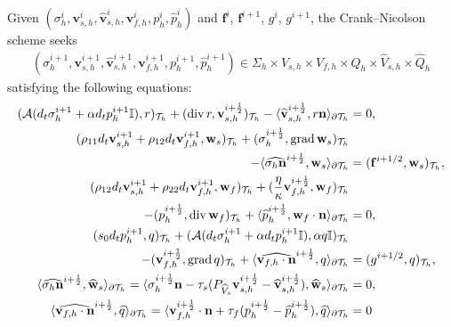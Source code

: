 \documentclass[10pt,letterpaper]{amsart}
\theoremstyle{plain} %
\theoremstyle{remark} %
\newcommand{\vect}[1]{\mathbf{#1}}
\newcommand{\divergence}{\mathrm{div}\,}
\newcommand{\grad}{\mathrm{grad}\,}
\newcommand{\Id}{\mathbb{I}} %
\newcommand{\Ael}{\mathcal{A}} %
\newcommand{\Thprod}[2]{( #1, #2 )_{\mathcal{T}_h}}
\newcommand{\pThprod}[2]{\langle #1, #2 \rangle_{\partial \mathcal{T}_{h}}}
\begin{document}
Given $(\sigma_h^i, \vect{v}_{s,h}^i, \widehat{\vect{v}}_{s,h}^i, \vect{v}_{f,h}^i, p_h^i, \widehat{p}_h^i)$ and $\vect{f}^i$, $\vect{f}^{i+1}$, $g^i$, $g^{i+1}$, the Crank--Nicolson scheme seeks 
%
\begin{align*}
	(\sigma_h^{i+1}, \vect{v}_{s,h}^{i+1}, \widehat{\vect{v}}_{s,h}^{i+1}, \vect{v}_{f,h}^{i+1}, p_h^{i+1}, \widehat{p}_h^{i+1}) \in \Sigma_{h} \times V_{s,h} \times V_{f,h} \times Q_{h} \times \widehat{V}_{s,h}\times \widehat{Q}_{h}
\end{align*}
%
satisfying the following equations:  
%
\begin{subequations}
	\label{eq:fully-discrete-cn-eqs}
	\begin{align}
		\label{eq:fully-discrete-cn-eq1}
		\Thprod{\Ael(d_t \sigma_{h}^{i+1} + \alpha d_t{p}_{h}^{i+1} \Id)}{r} +\Thprod{\divergence r}{\vect{v}_{s,h}^{i+\frac 12}} -\pThprod{\widehat{\vect{v}}_{s,h}^{i+\frac 12}}{r \vect{n}} &= 0 ,
		\\ 
		\label{eq:fully-discrete-cn-eq2}		\Thprod{\rho_{11}d_t{\vect{v}}_{s,h}^{i+1}+\rho_{12}d_t{\vect{v}}_{f,h}^{i+1}}{\vect{w}_{s}} + \Thprod{\sigma_{h}^{i+\frac 12}}{\grad \vect{w}_{s}} &
        \\
        \notag 
        -\pThprod{\widehat{\sigma_{h} \vect{n}}^{i+\frac 12} }{\vect{w}_{s}} 
		&= {\Thprod{\vect{f}^{i+1/2}}{\vect{w}_{s}}}, 
		\\
		\label{eq:fully-discrete-cn-eq3}
		\Thprod{\rho_{12}d_t{\vect{v}}_{s,h}^{i+1}+\rho_{22}d_t{\vect{v}}_{f,h}^{i+1}}{\vect{w}_{f}} + \Thprod{\frac{\eta}{\kappa} \vect{v}_{f,h}^{i+\frac 12}}{\vect{w}_{f}} 
		&
        \\
        \notag 
        - \Thprod{p_{h}^{i+\frac 12} }{\divergence\vect{w}_{f}} +\pThprod{\widehat{p}_{h}^{i+\frac 12}}{\vect{w}_{f}\cdot\vect{n}} &= 0, 
		\\
		\label{eq:fully-discrete-cn-eq4}
		\Thprod{s_{0}d_t{p}_{h}^{i+1}}{q} + \Thprod{\Ael(d_t{\sigma}_{h}^{i+1}+\alpha d_t{p}_{h}^{i+1}\Id)}{\alpha q\Id} &
        \\
        \notag 
        - \Thprod{\vect{v}_{f,h}^{i+\frac 12}}{\grad q} 
		+\pThprod{\widehat{\vect{v}_{f,h}\cdot \vect{n}}^{i+\frac 12} }{q}
		&={\Thprod{g^{i+1/2} }{q}}, 
		\\
		\label{eq:fully-discrete-cn-eq5}
		\pThprod{\widehat{\sigma_h\vect{n}}^{i+\frac 12}  }{\widehat{\vect{w}}_{s}}
		=
		\pThprod{\sigma_h^{i+\frac 12} \vect{n} - \tau_{s} ({P_{\widehat{V}_s}} \vect{v}_{s,h}^{i+\frac 12} - \widehat{\vect{v}}_{s,h}^{i+\frac 12})}{\widehat{\vect{w}}_{s}} &= 0, 
		\\
		\label{eq:fully-discrete-cn-eq6}
		\pThprod{\widehat{\vect{v}_{f,h} \cdot \vect{n}}^{i+\frac 12} }{\widehat{q}}
		=
		\pThprod{\vect{v}_{f,h}^{i+\frac 12}\cdot \vect{n} + \tau_f (p_h^{i+\frac 12} - \widehat{p}_h^{i+\frac 12})}{\widehat{q}} &= 0
	\end{align}
\end{subequations}
\end{document}
